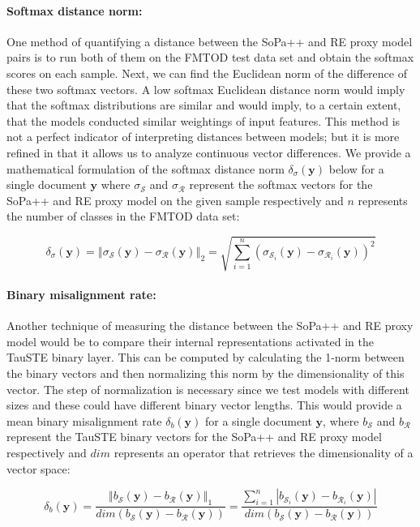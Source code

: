 \paragraph{Softmax distance norm:} One method of quantifying a distance between
the SoPa++ and RE proxy model pairs is to run both of them on the FMTOD test
data set and obtain the softmax scores on each sample. Next, we can find the
Euclidean norm of the difference of these two softmax vectors. A low softmax
Euclidean distance norm would imply that the softmax distributions are similar
and would imply, to a certain extent, that the models conducted similar
weightings of input features. This method is not a perfect indicator of
interpreting distances between models; but it is more refined in that it allows
us to analyze continuous vector differences. We provide a mathematical
formulation of the softmax distance norm $\delta_{\sigma}(\bm{y})$ below for a single
document $\bm{y}$ where $\sigma_{\mathcal{S}}$ and $\sigma_{\mathcal{R}}$ represent the
softmax vectors for the SoPa++ and RE proxy model on the given sample
respectively and $n$ represents the number of classes in the FMTOD data set:

\begin{equation}
  \delta_{\sigma}(\bm{y}) = \left\Vert \sigma_{\mathcal{S}}(\bm{y}) - \sigma_{\mathcal{R}}(\bm{y}) \right\Vert_{2} = \sqrt{\sum^n_{i=1} (\sigma_{\mathcal{S}_i}(\bm{y}) - \sigma_{\mathcal{R}_i}(\bm{y}))^2} 
\end{equation}

\paragraph{Binary misalignment rate:} Another technique of measuring the
distance between the SoPa++ and RE proxy model would be to compare their
internal representations activated in the TauSTE binary layer. This can be
computed by calculating the 1-norm between the binary vectors and then
normalizing this norm by the dimensionality of this vector. The step of
normalization is necessary since we test models with different sizes and these
could have different binary vector lengths. This would provide a mean binary
misalignment rate $\delta_b(\bm{y})$ for a single document $\bm{y}$, where
$b_{\mathcal{S}}$ and $b_{\mathcal{R}}$ represent the TauSTE binary vectors for
the SoPa++ and RE proxy model respectively and $dim$ represents an operator that
retrieves the dimensionality of a vector space:

\begin{equation}
  \delta_b(\bm{y}) = \dfrac{\left\Vert b_{\mathcal{S}}(\bm{y}) - b_{\mathcal{R}}(\bm{y}) \right\Vert_{1}}{dim(b_{\mathcal{S}}(\bm{y}) - b_{\mathcal{R}}(\bm{y}))} = \dfrac{\sum^n_{i=1} |b_{\mathcal{S}_i}(\bm{y}) - b_{\mathcal{R}_i}(\bm{y})|}{{dim(b_{\mathcal{S}}(\bm{y}) - b_{\mathcal{R}}(\bm{y}))}}
\end{equation}


